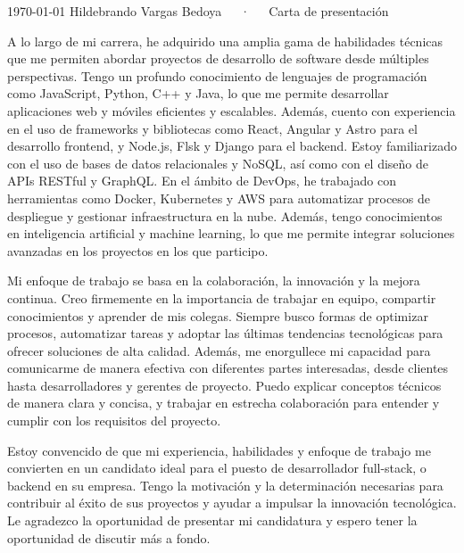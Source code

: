\documentclass[11pt, a4paper]{awesome-cv}
\begin{document}
\makecvheader[R]

\makecvfooter
  {\today}
  {Hildebrando Vargas Bedoya~~~·~~~Carta de presentación }
  {}

\makelettertitle

\begin{cvletter}

A lo largo de mi carrera, he adquirido una amplia gama de habilidades técnicas que me permiten abordar proyectos de desarrollo de software desde múltiples perspectivas. Tengo un profundo conocimiento de lenguajes de programación como JavaScript, Python, C++ y Java, lo que me permite desarrollar aplicaciones web y móviles eficientes y escalables.
Además, cuento con experiencia en el uso de frameworks y bibliotecas como React, Angular y Astro para el desarrollo frontend, y Node.js, Flsk y Django para el backend. Estoy familiarizado con el uso de bases de datos relacionales y NoSQL, así como con el diseño de APIs RESTful y GraphQL.
En el ámbito de DevOps, he trabajado con herramientas como Docker, Kubernetes y AWS para automatizar procesos de despliegue y gestionar infraestructura en la nube. Además, tengo conocimientos en inteligencia artificial y machine learning, lo que me permite integrar soluciones avanzadas en los proyectos en los que participo.

Mi enfoque de trabajo se basa en la colaboración, la innovación y la mejora continua. Creo firmemente en la importancia de trabajar en equipo, compartir conocimientos y aprender de mis colegas. Siempre busco formas de optimizar procesos, automatizar tareas y adoptar las últimas tendencias tecnológicas para ofrecer soluciones de alta calidad.
Además, me enorgullece mi capacidad para comunicarme de manera efectiva con diferentes partes interesadas, desde clientes hasta desarrolladores y gerentes de proyecto. Puedo explicar conceptos técnicos de manera clara y concisa, y trabajar en estrecha colaboración para entender y cumplir con los requisitos del proyecto.

Estoy convencido de que mi experiencia, habilidades y enfoque de trabajo me convierten en un candidato ideal para el puesto de desarrollador full-stack, o backend en su empresa. Tengo la motivación y la determinación necesarias para contribuir al éxito de sus proyectos y ayudar a impulsar la innovación tecnológica.
Le agradezco la oportunidad de presentar mi candidatura y espero tener la oportunidad de discutir más a fondo. 

\end{cvletter}


\makeletterclosing
\end{document}
